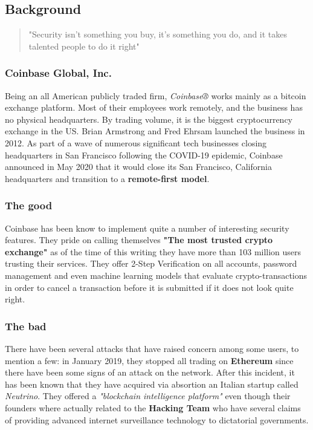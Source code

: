 \documentclass[12pt,a4paper]{article}
\begin{document}
\subsection{Background}
\begin{quote}
"Security isn’t something you buy, it’s something you do, and it takes talented people to do it right"
\end{quote}
\begin{justify}
\subsubsection{Coinbase Global, Inc.}
Being an all American publicly traded firm, \textit{Coinbase®} works mainly as a bitcoin exchange platform. Most of their employees work remotely, and the business has no physical headquarters. By trading volume, it is the biggest cryptocurrency exchange in the US. Brian Armstrong and Fred Ehrsam launched the business in 2012. As part of a wave of numerous significant tech businesses closing headquarters in San Francisco following the COVID-19 epidemic, Coinbase announced in May 2020 that it would close its San Francisco, California headquarters and transition to a \textbf{remote-first model}.
\end{justify}
 \subsubsection{The good}
 \begin{justify}
Coinbase has been know to implement quite a number of interesting security features. They pride on calling themselves \textbf{"The most trusted crypto exchange"} as of the time of this writing they have more than 103 million users trusting their services. They offer 2-Step Verification on all accounts, password management and even machine learning models that evaluate crypto-transactions in order to cancel a transaction before it is submitted if it does not look quite right.
 \end{justify}
  \subsubsection{The bad}
 \begin{justify}
There have been several attacks that have raised concern among some users, to mention a few: in January 2019, they stopped all trading on \textbf{Ethereum} since there have been some signs of an attack on the network. After this incident, it has been known that they have acquired via absortion an Italian startup called \textit{Neutrino}. They offered a \textit{"blockchain intelligence platform"} even though their founders where actually related to the \textbf{Hacking Team} who have several claims of providing advanced internet surveillance technology to dictatorial governments.
 \end{justify}
 \clearpage
\end{document}
